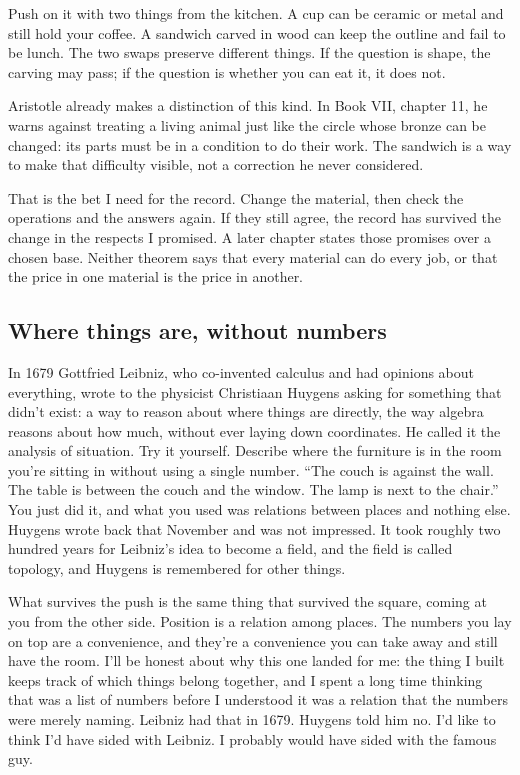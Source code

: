 \documentclass[11pt,twoside]{article}
\theoremstyle{thielethm}
\theoremstyle{thieledef}
\theoremstyle{thieledef}
\theoremstyle{thieledef}
\theoremstyle{thielethm}
\theoremstyle{thieleobs}
\theoremstyle{thielethm}
\begin{document}
Push on it with two things from the kitchen. A cup can be ceramic or metal and still hold your coffee. A sandwich carved in wood can keep the outline and fail to be lunch. The two swaps preserve different things. If the question is shape, the carving may pass; if the question is whether you can eat it, it does not.

Aristotle already makes a distinction of this kind. In Book VII, chapter 11, he warns against treating a living animal just like the circle whose bronze can be changed: its parts must be in a condition to do their work. The sandwich is a way to make that difficulty visible, not a correction he never considered.

That is the bet I need for the record. Change the material, then check the operations and the answers again. If they still agree, the record has survived the change in the respects I promised. A later chapter states those promises over a chosen base. Neither theorem says that every material can do every job, or that the price in one material is the price in another.

\subsection{Where things are, without numbers}

In 1679 Gottfried Leibniz, who co-invented calculus and had opinions about everything, wrote to the physicist Christiaan Huygens asking for something that didn't exist: a way to reason about where things are directly, the way algebra reasons about how much, without ever laying down coordinates. He called it the analysis of situation. Try it yourself. Describe where the furniture is in the room you're sitting in without using a single number. ``The couch is against the wall. The table is between the couch and the window. The lamp is next to the chair.'' You just did it, and what you used was relations between places and nothing else. Huygens wrote back that November and was not impressed. It took roughly two hundred years for Leibniz's idea to become a field, and the field is called topology, and Huygens is remembered for other things.

What survives the push is the same thing that survived the square, coming at you from the other side. Position is a relation among places. The numbers you lay on top are a convenience, and they're a convenience you can take away and still have the room. I'll be honest about why this one landed for me: the thing I built keeps track of which things belong together, and I spent a long time thinking that was a list of numbers before I understood it was a relation that the numbers were merely naming. Leibniz had that in 1679. Huygens told him no. I'd like to think I'd have sided with Leibniz. I probably would have sided with the famous guy.
\end{document}
